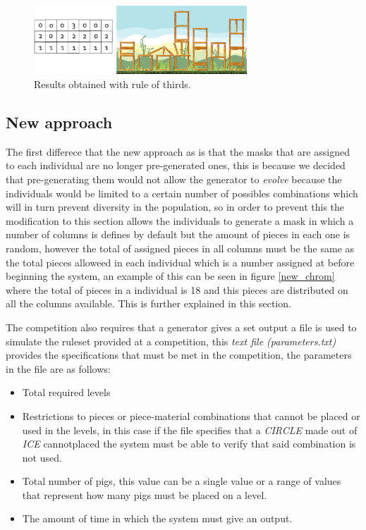 \documentclass[conference]{IEEEtran}
\begin{document}
\begin{figure}[htbp]
    \centerline{\includegraphics[width=80mm]{Images/result_example_thirds.png}}
    \caption{Results obtained with rule of thirds.}
    \label{rule_of_thirds_result}
\end{figure}

\subsection{New approach}

The first differece that the new approach as is that the masks that are assigned to each individual are no longer pre-generated ones, this is because we decided that pre-generating them would not allow the generator to \textit{evolve} because the individuals would be limited to a certain number of possibles combinations which will in turn prevent diversity in the population, so in order to prevent this the modification to this section allows the individuals to generate a mask in which a number of columns is defines by default but the amount of pieces in each one is random, however the total of assigned pieces in all columns must be the same as the total pieces alloweed in each individual which is a number assigned at before beginning the system, an example of this can be seen in figure \ref{new_chrom} where the total of pieces in a individual is 18 and this pieces are distributed on all the columns available. This is further explained in this section.

The competition also requires that a generator gives a set output a file is used to simulate the ruleset provided at a competition, this \textit{text file (parameters.txt)} provides the specifications that must be met in the competition, the parameters in the file are as follows:

\begin{itemize}
    \item Total required levels
    \item Restrictions to pieces or piece-material combinations that cannot be placed or used in the levels, in this case if the file specifies that a \textit{CIRCLE} made out of \textit{ICE} cannotplaced the system must be able to verify that said combination is not used.
    \item Total number of pigs, this value can be a single value or a range of values that represent how many pigs must be placed on a level.
    \item The amount of time in which the system must give an output.
\end{itemize}
\end{document}
